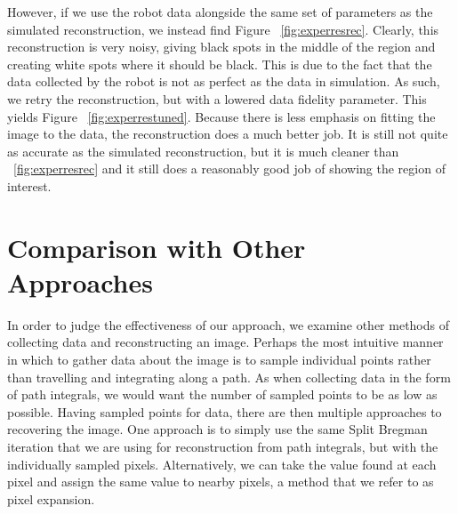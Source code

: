 \documentclass[english]{article}\usepackage[]{graphicx}\usepackage[]{color}
\begin{document}
However, if we use the robot data alongside the same set of parameters as the simulated reconstruction, we instead find Figure ~\ref{fig:experresrec}. Clearly, this reconstruction is very noisy, giving black spots in the middle of the region and creating white spots where it should be black. This is due to the fact that the data collected by the robot is not as perfect as the data in simulation. As such, we retry the reconstruction, but with a lowered data fidelity parameter. This yields Figure ~\ref{fig:experrestuned}. Because there is less emphasis on fitting the image to the data, the reconstruction does a much better job. It is still not quite as accurate as the simulated reconstruction, but it is much cleaner than ~\ref{fig:experresrec} and it still does a reasonably good job of showing the region of interest.


\section{Comparison with Other Approaches}

In order to judge the effectiveness of our approach, we examine other methods of collecting data and reconstructing an image. Perhaps the most intuitive manner in which to gather data about the image is to sample individual points rather than travelling and integrating along a path. As when collecting data in the form of path integrals, we would want the number of sampled points to be as low as possible. Having sampled points for data, there are then multiple approaches to recovering the image. One approach is to simply use the same Split Bregman iteration that we are using for reconstruction from path integrals, but with the individually sampled pixels. Alternatively, we can take the value found at each pixel and assign the same value to nearby pixels, a method that we refer to as pixel expansion.
\end{document}
